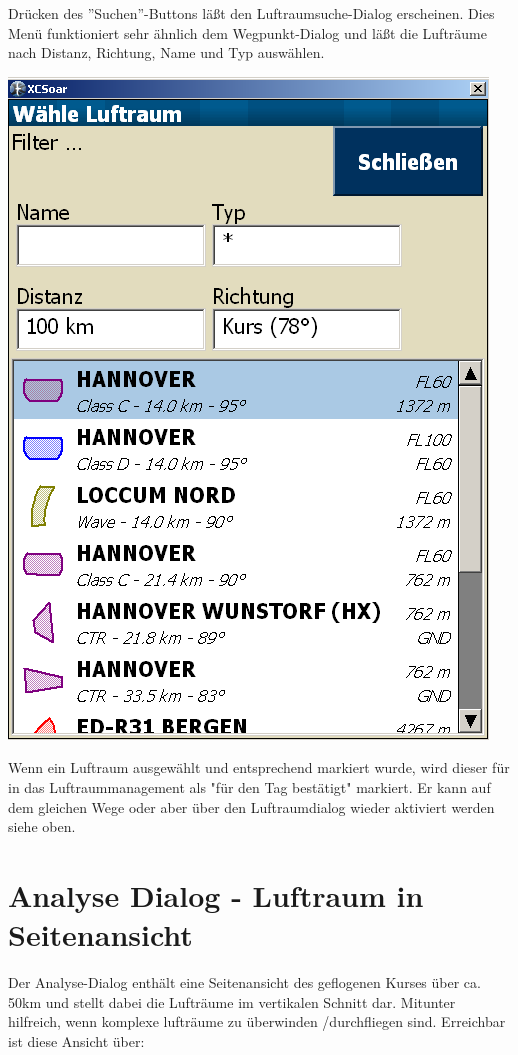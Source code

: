 Drücken des ''Suchen''-Buttons läßt den Luftraumsuche-Dialog erscheinen.
Dies Menü funktioniert sehr ähnlich dem Wegpunkt-Dialog und läßt die Lufträume nach Distanz,
Richtung, Name und Typ auswählen.

\begin{center}
\includegraphics[angle=0,width=0.7\linewidth,keepaspectratio='true']{figures/airspacelookup.png}
\end{center}

Wenn ein Luftraum ausgewählt und entsprechend markiert wurde, wird dieser für
in das Luftraummanagement als "für den Tag  bestätigt" markiert.
Er kann auf dem gleichen Wege oder aber über den Luftraumdialog  wieder aktiviert werden siehe oben.

\section{Analyse  Dialog - Luftraum in Seitenansicht}
Der Analyse-Dialog enthält eine Seitenansicht des geflogenen Kurses über ca. 50km und stellt
dabei die Lufträume im vertikalen Schnitt dar.
Mitunter hilfreich, wenn komplexe lufträume zu überwinden /durchfliegen sind.
Erreichbar ist diese Ansicht über:

\begin{quote}
\blink{}
\end{quote}

